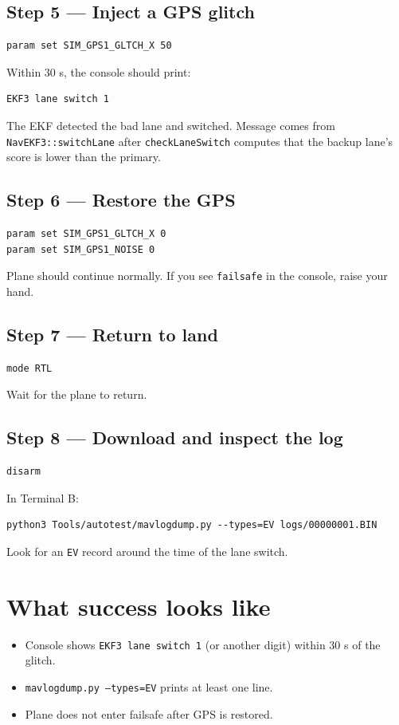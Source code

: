 \documentclass[a4paper,11pt,twoside]{article}
\begin{document}
\subsection*{Step 5 --- Inject a GPS glitch}
\begin{Verbatim}[frame=single,fontsize=\small]
param set SIM_GPS1_GLTCH_X 50
\end{Verbatim}
Within 30 s, the console should print:
\begin{Verbatim}[frame=single,fontsize=\small]
EKF3 lane switch 1
\end{Verbatim}
The EKF detected the bad lane and switched. Message comes from \texttt{NavEKF3::switchLane} after \texttt{checkLaneSwitch} computes that the backup lane's score is lower than the primary.

\subsection*{Step 6 --- Restore the GPS}
\begin{Verbatim}[frame=single,fontsize=\small]
param set SIM_GPS1_GLTCH_X 0
param set SIM_GPS1_NOISE 0
\end{Verbatim}
Plane should continue normally. If you see \texttt{failsafe} in the console, raise your hand.

\subsection*{Step 7 --- Return to land}
\begin{Verbatim}[frame=single,fontsize=\small]
mode RTL
\end{Verbatim}
Wait for the plane to return.

\subsection*{Step 8 --- Download and inspect the log}
\begin{Verbatim}[frame=single,fontsize=\small]
disarm
\end{Verbatim}
In Terminal B:
\begin{Verbatim}[frame=single,fontsize=\small]
python3 Tools/autotest/mavlogdump.py --types=EV logs/00000001.BIN
\end{Verbatim}
Look for an \texttt{EV} record around the time of the lane switch.

\section*{What success looks like}
\begin{itemize}
  \item Console shows \texttt{EKF3 lane switch 1} (or another digit) within 30 s of the glitch.
  \item \texttt{mavlogdump.py --types=EV} prints at least one line.
  \item Plane does not enter failsafe after GPS is restored.
\end{itemize}
\end{document}
